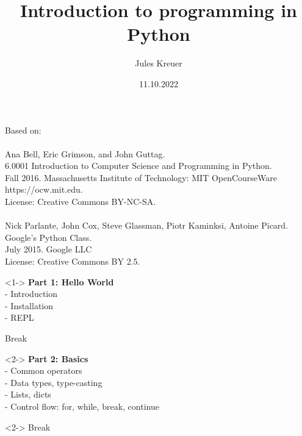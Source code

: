 \documentclass{beamer}
\title[]{Introduction to programming in Python} %
\author{Jules Kreuer} %
\institute[FSI] %
{
Uni Tübingen\\ %
\medskip
\textit{fsi@fsi.uni-tuebingen.de}\\
\textit{contact@juleskreuer.eu}\\
}
\date{11.10.2022} %
\begin{document}
\begin{frame}
\titlepage %
\end{frame}


\begin{frame}
    Based on:\\\\
    Ana Bell, Eric Grimson, and John Guttag. \\
    6.0001 Introduction to Computer Science and Programming in Python.\\
    Fall 2016. Massachusetts Institute of Technology: MIT OpenCourseWare\\
    https://ocw.mit.edu.\\
    License: Creative Commons BY-NC-SA.\\\\

    Nick Parlante, John Cox, Steve Glassman, Piotr Kaminksi, Antoine Picard.\\
    Google's Python Class.\\
    July 2015. Google LLC\\
    License: Creative Commons BY 2.5.
\end{frame}

\begin{frame}
    \begin{block}{}<1->
        \textbf{Part 1: Hello World}\\
        - Introduction\\
        - Installation \\
        - REPL\\
    \end{block}
    \begin{exampleblock}{}
    Break
    \end{exampleblock}
    \begin{block}{}<2->
    \textbf{\textbf{Part 2:} Basics}\\
    - Common operators\\
    - Data types, type-casting\\
    - Lists, dicts\\
    - Control flow: for, while, break, continue\\
    \end{block}
    \begin{exampleblock}{}<2->
        Break
    \end{exampleblock}
\end{frame}
\end{document}
